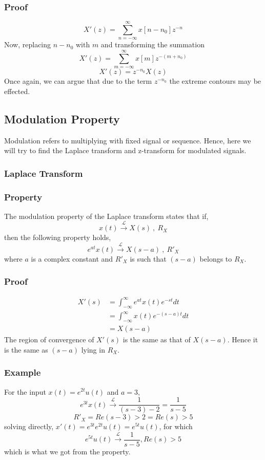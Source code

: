 \subsubsection{Proof}
\[
X'(z) = \sum_{n=-\infty}^{\infty}{x[n-n_0]z^{-n}}
\]
Now, replacing $n-n_0$ with $m$ and transforming the summation
\[
X'(z) = \sum_{m=-\infty}^{\infty}{x[m]z^{-(m+n_0)}}
\]\[
X'(z) = z^{-n_0}X(z)
\]
Once again, we can argue that due to the term $z^{-n_0}$ the extreme contours may be effected.
\subsection{Modulation Property}
Modulation refers to multiplying with fixed signal or sequence. Hence, here we will try to find the Laplace transform and z-transform for modulated signals.
\subsubsection{Laplace Transform}
\subsubsection{Property}
The modulation property of the Laplace transform states that if,
\[
x(t) \xrightarrow{\ \mathcal{L}\ } X(s)\ ,\ R_{X}
\]
then the following property holds,
\[
e^{at}x(t) \xrightarrow{\ \mathcal{L}\ } X(s - a)\ ,\ {R'}_{X} 
\]
where $a$ is a complex constant and ${R'}_X$ is such that $(s-a)$ belongs to $R_X$.
\subsubsection{Proof}
\begin{align*}
X'(s) &= \int_{-\infty}^{\infty}{e^{at}x(t)e^{-st}dt}\\
&= \int_{-\infty}^{\infty}{x(t)e^{-(s-a)t}dt}\\
&= X(s-a)
\end{align*}
The region of convergence of $X'(s)$ is the same as that of $X(s-a)$. Hence it is the same as $(s-a)$ lying in $R_X$.
\subsubsection{Example}
For the input $x(t) = e^{2t}u(t)$ and $a = 3$,
\[
	e^{3t}x(t) \xrightarrow{\ \mathcal{L}\ } \frac{1}{(s-3) - 2} = \frac{1}{s - 5}
\]\[
	R'_X = Re(s-3) > 2 = Re(s) > 5
\]
solving directly, $x'(t) = e^{3t}e^{2t}u(t) = e^{5t}u(t)$, for which 
\[
	e^{5t}u(t) \xrightarrow{\ \mathcal{L}\ } \frac{1}{s-5} , Re(s) > 5
\]
which is what we got from the property.

